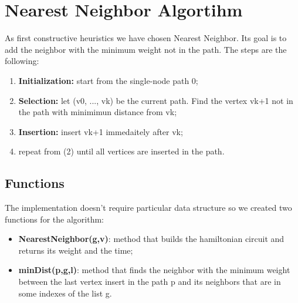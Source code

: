 \section{Nearest Neighbor Algortihm}\label{nearest}
As first constructive heuristics we have chosen Nearest Neighbor. Its goal is to add the neighbor with the minimum weight not in the path. The steps are the following:\\

\begin{enumerate}
	\item  \textbf{Initialization:} start from the single-node path 0;
	\item  \textbf{Selection:} let (v0, ..., vk) be the current path. Find the vertex vk+1 not in the path with minimimun distance from vk;
	\item  \textbf{Insertion:} insert vk+1 immedaitely after vk;
	\item repeat from (2) until all vertices are inserted in the path.
\end{enumerate}  


\subsection{Functions}
The implementation doesn't require particular data structure so we created two functions for the algorithm:
\begin{itemize}
	\item  \textbf{NearestNeighbor(g,v)}: method that builds the hamiltonian circuit and returns its weight and the time;
	\item  \textbf{minDist(p,g,l)}: method that finds the neighbor with the minimum weight between the last vertex insert in the path p and its neighbors that are in some indexes of the list g.
\end{itemize}



